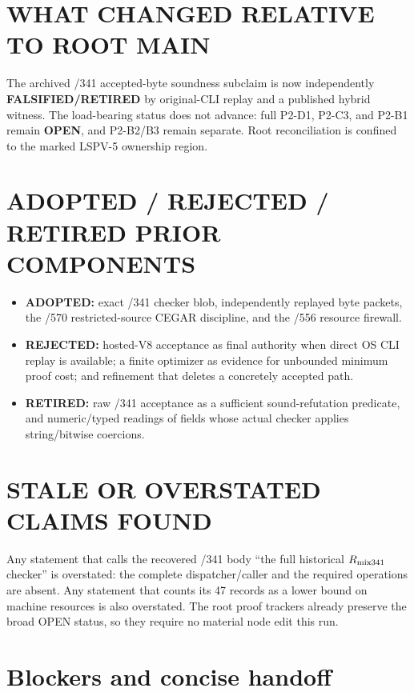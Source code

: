\documentclass[11pt]{article}
\newcommand{\OPEN}{\textbf{OPEN}}
\newcommand{\RET}{\textbf{FALSIFIED/RETIRED}}
\begin{document}
\section{WHAT CHANGED RELATIVE TO ROOT MAIN}

The archived /341 accepted-byte soundness subclaim is now independently
\RET{} by original-CLI replay and a published hybrid witness.  The load-bearing
status does not advance: full P2-D1, P2-C3, and P2-B1 remain \OPEN, and
P2-B2/B3 remain separate.  Root reconciliation is confined to the marked
LSPV-5 ownership region.

\section{ADOPTED / REJECTED / RETIRED PRIOR COMPONENTS}

\begin{itemize}
\item \textbf{ADOPTED:} exact /341 checker blob, independently replayed byte
  packets, the /570 restricted-source CEGAR discipline, and the /556 resource
  firewall.
\item \textbf{REJECTED:} hosted-V8 acceptance as final authority when direct OS
  CLI replay is available; a finite optimizer as evidence for unbounded
  minimum proof cost; and refinement that deletes a concretely accepted path.
\item \textbf{RETIRED:} raw /341 acceptance as a sufficient sound-refutation
  predicate, and numeric/typed readings of fields whose actual checker applies
  string/bitwise coercions.
\end{itemize}

\section{STALE OR OVERSTATED CLAIMS FOUND}

Any statement that calls the recovered /341 body ``the full historical
$R_{\rm mix341}$ checker'' is overstated: the complete dispatcher/caller and
the required operations are absent.  Any statement that counts its 47 records
as a lower bound on machine resources is also overstated.  The root proof
trackers already preserve the broad OPEN status, so they require no material
node edit this run.

\section{Blockers and concise handoff}
\end{document}
